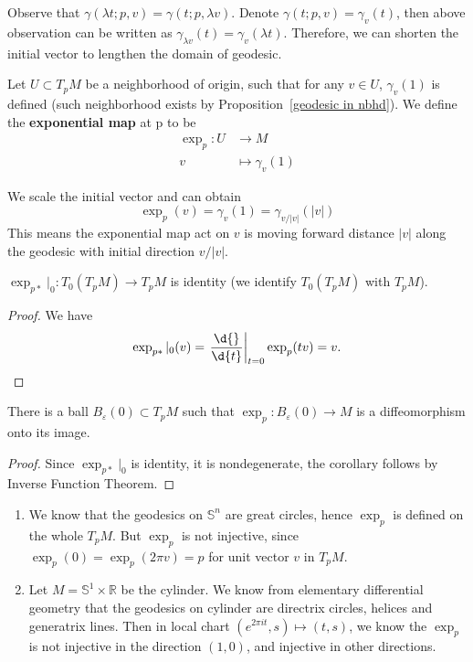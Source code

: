 Observe that $\gamma(\lambda t;p,v)=\gamma(t;p,\lambda v)$.
Denote $\gamma(t;p,v)=\gamma_v(t)$, then above observation can be written as $\gamma_{\lambda v}(t)=\gamma_v(\lambda t)$.
Therefore, we can shorten the initial vector to lengthen the domain of geodesic.

\begin{defn}
    Let $U\subset T_pM$ be a neighborhood of origin, such that for any $v\in U$, $\gamma_v(1)$ is defined (such neighborhood exists by Proposition~\ref{geodesic in nbhd}).
    We define the \textbf{exponential map} at p to be
    \begin{align*}
        \exp_p:U&\to M\\
        v&\mapsto\gamma_v(1)
    \end{align*}
\end{defn}

\begin{rem}
    We scale the initial vector and can obtain
    \[\exp_p(v)=\gamma_v(1)=\gamma_{v/|v|}(|v|)\]
    This means the exponential map act on $v$ is moving forward distance $|v|$ along the geodesic with initial direction $v/|v|$.
\end{rem}

\begin{prop}
    $\exp_{p*}|_0:T_0(T_pM)\to T_pM$ is identity (we identify $T_0(T_pM)$ with $T_pM$).
\end{prop}
\begin{proof}
    We have
    \[\exp_{p*}|_0(v)=\left.\frac{\d{}}{\d{t}}\right|_{t=0}\exp_p(tv)=v.\qedhere\]
\end{proof}

\begin{cor}
    There is a ball $B_\varepsilon(0)\subset T_pM$ such that $\exp_p:B_\varepsilon(0)\to M$ is a diffeomorphism onto its image.
\end{cor}
\begin{proof}
    Since $\exp_{p*}|_0$ is identity, it is nondegenerate, the corollary follows by Inverse Function Theorem.
\end{proof}

\begin{eg}
    \begin{enumerate}[(1)]
        \item We know that the geodesics on $\mathbb{S}^n$ are great circles, hence $\exp_p$ is defined on the whole $T_pM$.
        But $\exp_p$ is not injective, since $\exp_p(0)=\exp_p(2\pi v)=p$ for unit vector $v$ in $T_pM$.
        \item Let $M=\mathbb{S}^1\times\mathbb{R}$ be the cylinder.
        We know from elementary differential geometry that the geodesics on cylinder are directrix circles, helices and generatrix lines.
        Then in local chart $(e^{2\pi it},s)\mapsto(t,s)$, we know the $\exp_p$ is not injective in the direction $(1,0)$, and injective in other directions.
    \end{enumerate}
\end{eg}

